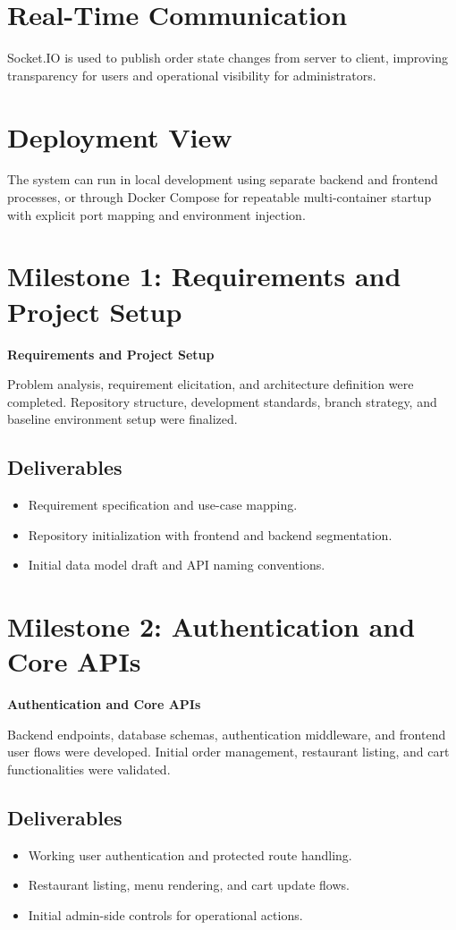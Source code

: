 \documentclass[12pt,a4paper]{report}
\begin{document}
\section{Real-Time Communication}
Socket.IO is used to publish order state changes from server to client, improving transparency for users and operational visibility for administrators.

\section{Deployment View}
The system can run in local development using separate backend and frontend processes, or through Docker Compose for repeatable multi-container startup with explicit port mapping and environment injection.

\section{Milestone 1: Requirements and Project Setup}
\textbf{Requirements and Project Setup}

Problem analysis, requirement elicitation, and architecture definition were completed. Repository structure, development standards, branch strategy, and baseline environment setup were finalized.

\subsection{Deliverables}
\begin{itemize}
    \item Requirement specification and use-case mapping.
    \item Repository initialization with frontend and backend segmentation.
    \item Initial data model draft and API naming conventions.
\end{itemize}

\section{Milestone 2: Authentication and Core APIs}
\textbf{Authentication and Core APIs}

Backend endpoints, database schemas, authentication middleware, and frontend user flows were developed. Initial order management, restaurant listing, and cart functionalities were validated.

\subsection{Deliverables}
\begin{itemize}
    \item Working user authentication and protected route handling.
    \item Restaurant listing, menu rendering, and cart update flows.
    \item Initial admin-side controls for operational actions.
\end{itemize}
\end{document}

